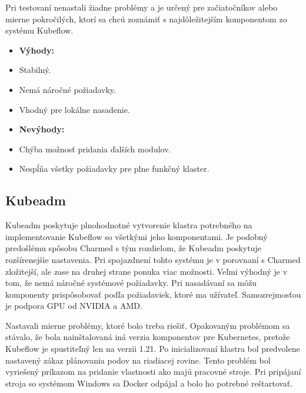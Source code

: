 Pri testovaní nenastali žiadne problémy a je určený pre začiatočníkov alebo mierne pokročilých, ktorí sa chcú zoznámiť s najdôležitejším komponentom zo systému Kubeflow.
\newline
\newline
\begin{minipage}[t]{.45\textwidth}
    \begin{itemize}
        \item []\textbf{Výhody:}
        \item Stabilný.
	    \item Nemá náročné požiadavky.
        \item Vhodný pre lokálne nasadenie.
    \end{itemize}
\end{minipage}%
\begin{minipage}[t]{.55\textwidth}
    \begin{itemize}
        \item []\textbf{Nevýhody:}
        \item Chýba možnosť pridania ďalších modulov.
	    \item Nespĺňa všetky požiadavky pre plne funkčný klaster.
    \end{itemize}
\end{minipage}

\subsection*{Kubeadm}

Kubeadm poskytuje plnohodnotné vytvorenie klastra potrebného na implementovanie Kubeflow so všetkými jeho komponentami. Je podobný predošlému spôsobu Charmed s tým rozdielom, že Kubeadm poskytuje rozšírenejšie nastavenia. Pri spojazdnení tohto systému je v porovnaní s Charmed zložitejší, ale zase na druhej strane ponuka viac možnosti. Veľmi výhodný je v tom, že nemá náročné systémové požiadavky. Pri nasadávaní sa môžu komponenty prispôsobovať podľa požiadaviek, ktoré ma užívateľ. Samozrejmosťou je podpora GPU od NVIDIA a AMD.

Nastavali mierne problémy, ktoré bolo treba riešiť. Opakovaným problémom sa stávalo, že bola nainštalovaná iná verzia komponentov pre Kubernetes, pretože Kubeflow je spustiteľný len na verzii 1.21. Po inicializovaní klastra bol predvolene nastavený zákaz plánovania podov na riadiacej rovine. Tento problém bol vyriešený príkazom na pridanie vlastnosti ako majú pracovné stroje. Pri pripájaní stroja so systémom Windows sa Docker odpájal a bolo ho potrebné reštartovať.

